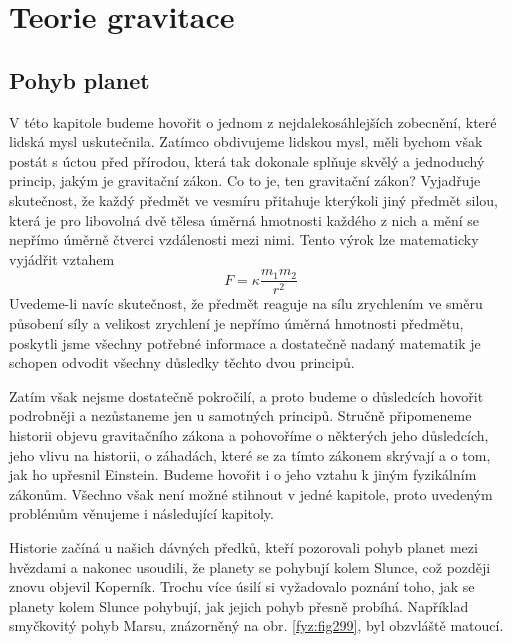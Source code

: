 {
\chapter{Teorie gravitace}\label{fyz:chap_fey_gravity}
\minitoc
  \section{Pohyb planet}
    V této kapitole budeme hovořit o jednom z nejdalekosáhlejších zobecnění, které lidská mysl 
    uskutečnila. Zatímco obdivujeme lidskou mysl, měli bychom však postát s úctou před přírodou, 
    která tak dokonale splňuje skvělý a jednoduchý princip, jakým je gravitační zákon. Co to je, 
    ten gravitační zákon? Vyjadřuje skutečnost, že každý předmět ve vesmíru přitahuje kterýkoli 
    jiný předmět silou, která je pro libovolná dvě tělesa úměrná hmotnosti každého z nich a mění se 
    nepřímo úměrně čtverci vzdálenosti mezi nimi. Tento výrok lze matematicky vyjádřit vztahem
    \begin{equation}\label{FYZ:eq096}
      F = \kappa\frac{m_1m_2}{r^2}
    \end{equation}
    Uvedeme-li navíc skutečnost, že předmět reaguje na sílu zrychlením ve směru působení síly a 
    velikost zrychlení je nepřímo úměrná hmotnosti předmětu, poskytli jsme všechny potřebné 
    informace a dostatečně nadaný matematik je schopen odvodit všechny důsledky těchto dvou 
    principů.
    
    Zatím však nejsme dostatečně pokročilí, a proto budeme o důsledcích hovořit podrobněji a 
    nezůstaneme jen u samotných principů. Stručně připomeneme historii objevu gravitačního zákona a 
    pohovoříme o některých jeho důsledcích, jeho vlivu na historii, o záhadách, které se za tímto 
    zákonem skrývají a o tom, jak ho upřesnil Einstein. Budeme hovořit i o jeho vztahu k jiným 
    fyzikálním zákonům. Všechno však není možné stihnout v jedné kapitole, proto uvedeným problémům 
    věnujeme i následující kapitoly.
    
    Historie začíná u našich dávných předků, kteří pozorovali pohyb planet mezi hvězdami a nakonec 
    usoudili, že planety se pohybují kolem Slunce, což později znovu objevil Koperník. Trochu více 
    úsilí si vyžadovalo poznání toho, jak se planety kolem Slunce pohybují, jak jejich pohyb přesně 
    probíhá. Například smyčkovitý pohyb Marsu, znázorněný na obr. \ref{fyz:fig299}, byl obzvláště 
    matoucí.
    
}
